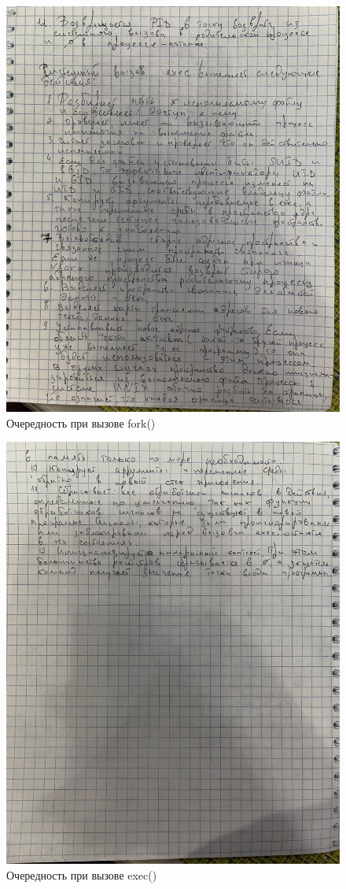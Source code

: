 \documentclass[a4paper,14pt]{article}
\begin{document}
\begin{figure}[ht]
	\centering
	\includegraphics[scale=0.15]{7.jpeg}
	\caption{Очередность при вызове fork()}
	\label{fig:7}
\end{figure}

\begin{figure}[ht]
	\centering
	\includegraphics[scale=0.15]{8.jpeg}
	\caption{Очередность при вызове exec()}
	\label{fig:8}
\end{figure}
\end{document}

